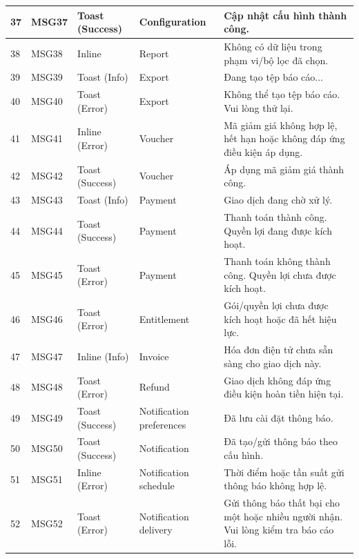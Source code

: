 \documentclass[12pt,a4paper,oneside]{report}
\begin{document}
{\begin{longtable}{|p{0.7cm}|p{1.25cm}|p{2.0cm}|p{2.6cm}|p{6.4cm}|}
37 & MSG37 & Toast (Success) & Configuration & Cập nhật cấu hình thành công. \\ \hline
38 & MSG38 & Inline & Report & Không có dữ liệu trong phạm vi/bộ lọc đã chọn. \\ \hline
39 & MSG39 & Toast (Info) & Export & Đang tạo tệp báo cáo... \\ \hline
40 & MSG40 & Toast (Error) & Export & Không thể tạo tệp báo cáo. Vui lòng thử lại. \\ \hline
41 & MSG41 & Inline (Error) & Voucher & Mã giảm giá không hợp lệ, hết hạn hoặc không đáp ứng điều kiện áp dụng. \\ \hline
42 & MSG42 & Toast (Success) & Voucher & Áp dụng mã giảm giá thành công. \\ \hline
43 & MSG43 & Toast (Info) & Payment & Giao dịch đang chờ xử lý. \\ \hline
44 & MSG44 & Toast (Success) & Payment & Thanh toán thành công. Quyền lợi đang được kích hoạt. \\ \hline
45 & MSG45 & Toast (Error) & Payment & Thanh toán không thành công. Quyền lợi chưa được kích hoạt. \\ \hline
46 & MSG46 & Toast (Error) & Entitlement & Gói/quyền lợi chưa được kích hoạt hoặc đã hết hiệu lực. \\ \hline
47 & MSG47 & Inline (Info) & Invoice & Hóa đơn điện tử chưa sẵn sàng cho giao dịch này. \\ \hline
48 & MSG48 & Toast (Error) & Refund & Giao dịch không đáp ứng điều kiện hoàn tiền hiện tại. \\ \hline
49 & MSG49 & Toast (Success) & Notification preferences & Đã lưu cài đặt thông báo. \\ \hline
50 & MSG50 & Toast (Success) & Notification & Đã tạo/gửi thông báo theo cấu hình. \\ \hline
51 & MSG51 & Inline (Error) & Notification schedule & Thời điểm hoặc tần suất gửi thông báo không hợp lệ. \\ \hline
52 & MSG52 & Toast (Error) & Notification delivery & Gửi thông báo thất bại cho một hoặc nhiều người nhận. Vui lòng kiểm tra báo cáo lỗi. \\ \hline
\end{longtable}
}


\clearpage
\setcounter{figure}{34}


\setcounter{figure}{96}

\clearpage

\end{document}
